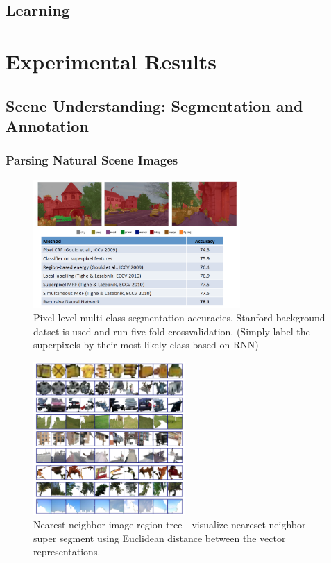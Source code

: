 \documentclass{beamer}
\begin{document}
\subsection{Learning}
\frame
{
}
\section{Experimental Results}
\subsection{Scene Understanding: Segmentation and Annotation}
\frame
{
  \frametitle{Parsing Natural Scene Images}
  \begin{figure}[ht]  
  	\begin{center}
  		\includegraphics[width=3.1in]{images/ex5.png}   
		\caption{Pixel level multi-class segmentation accuracies. Stanford background datset is used and run five-fold crossvalidation. (Simply label the superpixels by their most likely class based on RNN)}
	\end{center}
  \end{figure}
}
\frame
{
  \begin{figure}[ht]  
  	\begin{center}
  		\includegraphics[height=2.3in]{images/ex2.png}   
		\caption{Nearest neighbor image region tree - visualize neareset neighbor super segment using Euclidean distance between the vector representations.}
	\end{center}
  \end{figure}
}
\end{document}
